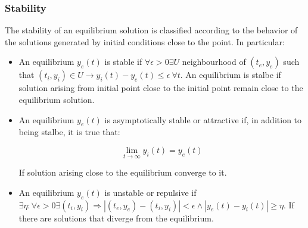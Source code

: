     \subsubsection{Stability}
    The stability of an equilibrium solution is classified according to the behavior of the solutions generated by initial conditions close to the point.
    In particular:

    \begin{multicols}{2}
      \begin{itemize}
        \item An equilibrium $y_e(t)$ is stable if $\forall\epsilon>0\exists U$ neighbourhood of $(t_e, y_e)$ such that $(t_i,y_i)\in U\rightarrow y_i(t)-y_e(t)\le\epsilon\ \forall t$.
          An equilibrium is stalbe if solution arising from initial point close to the initial point remain close to the equilibrium solution.
        \item An equilibrium $y_e(t)$ is asymptotically stable or attractive if, in addition to being stalbe, it is true that:

          $$\lim\limits_{t\rightarrow\infty}y_i(t) = y_e(t)$$

          If solution arising close to the equilibrium converge to it.
        \item An equilibrium $y_e(t)$ is unstable or repulsive if $\exists\eta:\forall \epsilon>0\exists (t_i, y_i)\Rightarrow |(t_e, y_e)-(t_i,y_i)| < \epsilon\land |y_e(t)-y_i(t)|\ge\eta$.
          If there are solutions that diverge from the equilibrium.
      \end{itemize}
    \end{multicols}










